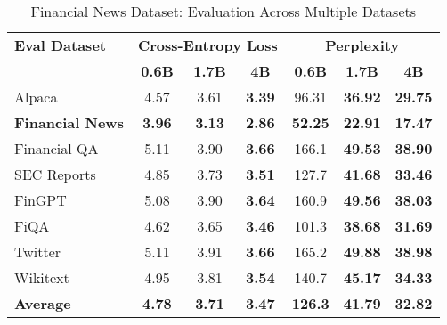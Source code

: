 
\begin{table}[htbp]
\centering
\caption[Financial News: Evaluation Results]{Financial News Dataset: Evaluation Across Multiple Datasets}
\label{tab:news_articles_results}
\begin{tabular}{l|ccc|ccc}
\hline
\textbf{Eval Dataset} & \multicolumn{3}{c|}{\textbf{Cross-Entropy Loss}} & \multicolumn{3}{c}{\textbf{Perplexity}} \\
\cline{2-4} \cline{5-7}
  & \textbf{0.6B} & \textbf{1.7B} & \textbf{4B} & \textbf{0.6B} & \textbf{1.7B} & \textbf{4B} \\
\hline
Alpaca & 4.57 & 3.61 & \textbf{3.39} & 96.31 & \textbf{36.92} & \textbf{29.75} \\
\textbf{Financial News} & \textbf{3.96} & \textbf{3.13} & \textbf{2.86} & \textbf{52.25} & \textbf{22.91} & \textbf{17.47} \\
Financial QA & 5.11 & 3.90 & \textbf{3.66} & 166.1 & \textbf{49.53} & \textbf{38.90} \\
SEC Reports & 4.85 & 3.73 & \textbf{3.51} & 127.7 & \textbf{41.68} & \textbf{33.46} \\
FinGPT & 5.08 & 3.90 & \textbf{3.64} & 160.9 & \textbf{49.56} & \textbf{38.03} \\
FiQA & 4.62 & 3.65 & \textbf{3.46} & 101.3 & \textbf{38.68} & \textbf{31.69} \\
Twitter & 5.11 & 3.91 & \textbf{3.66} & 165.2 & \textbf{49.88} & \textbf{38.98} \\
Wikitext & 4.95 & 3.81 & \textbf{3.54} & 140.7 & \textbf{45.17} & \textbf{34.33} \\
\hline
\textbf{Average} & \textbf{4.78} & \textbf{3.71} & \textbf{3.47} & \textbf{126.3} & \textbf{41.79} & \textbf{32.82} \\
\hline
\end{tabular}
\end{table}
